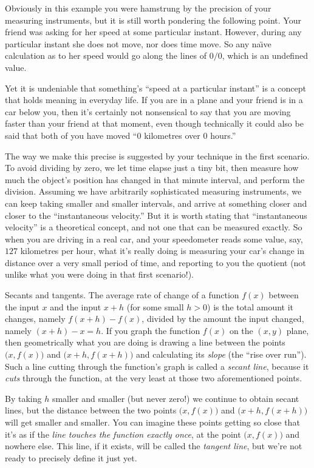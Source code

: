 Obviously in this example you were hamstrung by the precision of your measuring instruments, but it is still
worth pondering the following point. Your friend was asking for her speed at some particular instant.
However, during any particular instant she does not move, nor does time move. So any na{\"\i}ve calculation
as to her speed would go along the lines of $0/0$, which is an undefined value.

Yet it is undeniable that something's ``speed at a particular instant'' is a concept that holds meaning
in everyday life. If you are in a plane and your friend is in a car below you, then it's certainly
not nonsensical to say that you are moving faster than your friend at that moment, even though technically it
could also be said that both of you have moved ``$0$ kilometres over $0$ hours.''

The way we make this precise is suggested by your technique in the first scenario. To avoid dividing by zero,
we let time elapse just a tiny bit, then measure how much the object's position has changed in that minute
interval, and perform the division. Assuming we have arbitrarily sophisticated measuring instruments,
we can keep taking smaller and smaller intervals, and arrive at something closer and closer to the
``instantaneous velocity.'' But it is worth stating that ``instantaneous velocity'' is a theoretical concept,
and not one that can be measured exactly. So when you are driving in a real car, and your speedometer
reads some value, say, $127$ kilometres per hour, what it's really doing is measuring your car's
change in distance over a very small period of time, and reporting to you the quotient (not unlike what
you were doing in that first scenario!).

\medskip\boldlabel Secants and tangents.
The average rate of change of a function $f(x)$
between the input $x$ and the input $x+h$ (for
some small $h>0$) is
the total amount it changes, namely $f(x+h) - f(x)$, divided by the amount the input changed, namely
$(x+h)-x = h$.
If you graph the function $f(x)$ on the $(x,y)$ plane, then geometrically
what you are doing is drawing a line between the points
$\bigl( x, f(x)\bigr)$ and $\bigl( x+h, f(x+h)\bigr)$ and calculating its {\it slope} (the ``rise over
run''). Such a line cutting through the function's graph is called a {\it secant line}, because
it {\it cuts} through the function, at the very least at those two aforementioned points.

By taking $h$ smaller and smaller (but never zero!) we continue to obtain secant lines, but the distance
between the two points $\bigl( x, f(x)\bigr)$ and $\bigl( x+h, f(x+h)\bigr)$ will get smaller and smaller.
You can imagine these points getting so close that it's as if the {\sl line touches the function exactly
once}, at the point $\bigl(x, f(x)\bigr)$ and nowhere else. This line, if it exists, will be called
the {\it tangent line}, but we're not ready to precisely define it just yet.


